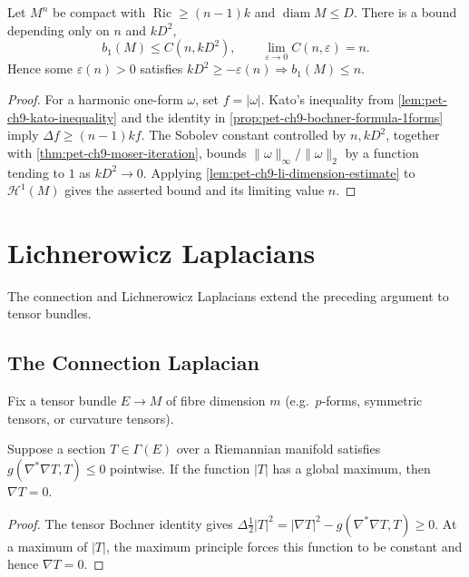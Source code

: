 \begin{theorem}
  \label{thm:pet-ch9-gromov-gallot-betti1-estimate}
  Let $M^n$ be compact with
  $\operatorname{Ric}\ge(n-1)k$ and $\operatorname{diam}M\le D$.  There is a
  bound depending only on $n$ and $kD^2$,
  \[
    b_1(M)\le C(n,kD^2),
    \qquad \lim_{\varepsilon\to0}C(n,\varepsilon)=n.
  \]
  Hence some $\varepsilon(n)>0$ satisfies
  $kD^2\ge-\varepsilon(n)\Longrightarrow b_1(M)\le n$.
\end{theorem}
\begin{proof}
  \sketch
  For a harmonic one-form \(\omega\), set \(f=|\omega|\).  Kato's inequality
  from \cref{lem:pet-ch9-kato-inequality} and the identity in
  \cref{prop:pet-ch9-bochner-formula-1forms} imply
  \(\Delta f\ge(n-1)kf\).  The Sobolev constant controlled by \(n,kD^2\),
  together with \cref{thm:pet-ch9-moser-iteration}, bounds
  \(\|\omega\|_\infty/\|\omega\|_2\) by a function tending to \(1\) as
  \(kD^2\to0\).  Applying \cref{lem:pet-ch9-li-dimension-estimate} to
  \(\mathcal H^1(M)\) gives the asserted bound and its limiting value \(n\).
\end{proof}

\section{Lichnerowicz Laplacians}

The connection and Lichnerowicz Laplacians extend the preceding argument to
tensor bundles.

\subsection{The Connection Laplacian}

Fix a tensor bundle $E\to M$ of fibre dimension $m$ (e.g.\ $p$-forms,
symmetric tensors, or curvature tensors).

\begin{proposition}
  \label{prop:pet-ch9-vanishing-connection-laplacian}
  Suppose a section $T\in\Gamma(E)$ over a Riemannian manifold satisfies
  $g(\nabla^*\nabla T,T)\le0$ pointwise.  If the function $|T|$ has a global
  maximum, then $\nabla T=0$.
\end{proposition}
\begin{proof}
  \sketch
  The tensor Bochner identity gives
  \(\Delta\tfrac12|T|^2=|\nabla T|^2-g(\nabla^*\nabla T,T)\ge0\).
  At a maximum of \(|T|\), the maximum principle forces this function to be
  constant and hence \(\nabla T=0\).
\end{proof}

